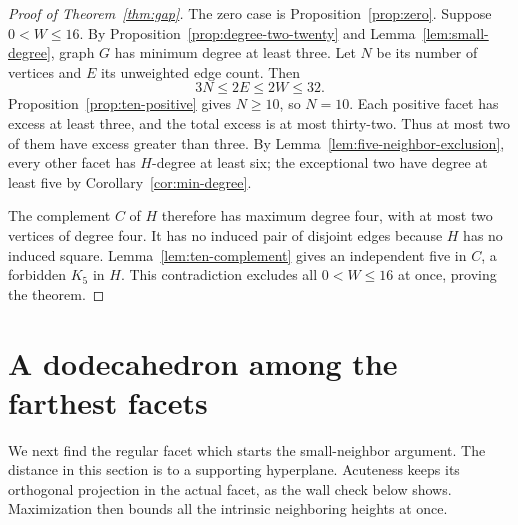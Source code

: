 \documentclass[11pt]{article}
\theoremstyle{remark}
\begin{document}
\begin{proof}[Proof of Theorem~\ref{thm:gap}]
The zero case is Proposition~\ref{prop:zero}. Suppose $0<W\le16$.
By Proposition~\ref{prop:degree-two-twenty} and
Lemma~\ref{lem:small-degree}, graph $G$ has minimum degree at
least three. Let $N$ be its number of vertices and $E$ its
unweighted edge count. Then
\[
 3N\le2E\le2W\le32.
\]
Proposition~\ref{prop:ten-positive} gives $N\ge10$, so $N=10$.
Each positive facet has excess at least three, and the total excess
is at most thirty-two. Thus at most two of them have excess greater
than three. By Lemma~\ref{lem:five-neighbor-exclusion}, every
other facet has $H$-degree at least six; the exceptional two have
degree at least five by Corollary~\ref{cor:min-degree}.

The complement $C$ of $H$ therefore has maximum degree four,
with at most two vertices of degree four. It has no induced pair
of disjoint edges because $H$ has no induced square.
Lemma~\ref{lem:ten-complement} gives an independent five in $C$,
a forbidden $K_5$ in $H$. This contradiction excludes all
$0<W\le16$ at once, proving the theorem.
\end{proof}


\section{A dodecahedron among the farthest facets}\label{sec:farthest}

We next find the regular facet which starts the small-neighbor argument.
The distance in this section is to a supporting hyperplane. Acuteness
keeps its orthogonal projection in the actual facet, as the wall check
below shows. Maximization then bounds all the intrinsic neighboring
heights at once.
\end{document}
